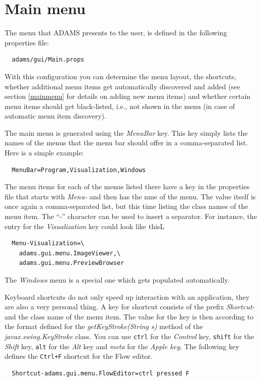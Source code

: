 \section{Main menu}
The menu that ADAMS presents to the user, is defined in the following properties
file:
\begin{verbatim}
  adams/gui/Main.props
\end{verbatim}
With this configuration you can determine the menu layout, the shortcuts, whether additional
menu items get automatically discovered and added (see section \ref{mainmenu} 
for details on adding new menu items) and whether certain menu items should
get black-listed, i.e., not shown in the menu (in case of automatic menu
item discovery).

The main menu is generated using the \textit{MenuBar} key. This key simply lists
the names of the menus that the menu bar should offer in a comma-separated
list. Here is a simple example:
\begin{verbatim}
  MenuBar=Program,Visualization,Windows
\end{verbatim}
The menu items for each of the menus listed there have a key in the properties
file that starts with \textit{Menu-} and then has the nme of the menu. The value
itself is once again a comma-separated list, but this time listing the class
names of the menu item. The ``-'' character can be used to insert a separator.
For instance, the entry for the \textit{Visualization} key could look like thisL
\begin{verbatim}
  Menu-Visualization=\
    adams.gui.menu.ImageViewer,\
    adams.gui.menu.PreviewBrowser
\end{verbatim}
The \textit{Windows} menu is a special one which gets populated automatically. 

\heading{Shortcuts}
Keyboard shortcuts do not only speed up interaction with an application, they 
are also a very personal thing. A key for shortcut consists of the prefix
\textit{Shortcut-} and the class name of the menu item. The value for the 
key is then according to the format defined for the \textit{getKeyStroke(String s)}
method of the \textit{javax.swing.KeyStroke} class. You can use \texttt{ctrl}
for the \textit{Control} key, \texttt{shift} for the \textit{Shift} key,
\texttt{alt} for the \textit{Alt} key and \textit{meta} for the 
\textit{Apple key}. The following key defines the \texttt{Ctrl+F} shortcut
for the Flow editor.
\begin{verbatim}
  Shortcut-adams.gui.menu.FlowEditor=ctrl pressed F
\end{verbatim}

